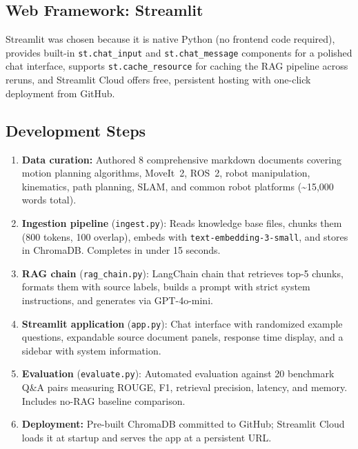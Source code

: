 \documentclass[12pt, a4paper]{article}
\begin{document}
\subsection{Web Framework: Streamlit}

Streamlit was chosen because it is native Python (no frontend code required), provides built-in \texttt{st.chat\_input} and \texttt{st.chat\_message} components for a polished chat interface, supports \texttt{st.cache\_resource} for caching the RAG pipeline across reruns, and Streamlit Cloud offers free, persistent hosting with one-click deployment from GitHub.

\subsection{Development Steps}

\begin{enumerate}
    \item \textbf{Data curation:} Authored 8 comprehensive markdown documents covering motion planning algorithms, MoveIt~2, ROS~2, robot manipulation, kinematics, path planning, SLAM, and common robot platforms (\textasciitilde15,000 words total).

    \item \textbf{Ingestion pipeline} (\texttt{ingest.py}): Reads knowledge base files, chunks them (800 tokens, 100 overlap), embeds with \texttt{text-embedding-3-small}, and stores in ChromaDB. Completes in under 15 seconds.

    \item \textbf{RAG chain} (\texttt{rag\_chain.py}): LangChain chain that retrieves top-5 chunks, formats them with source labels, builds a prompt with strict system instructions, and generates via GPT-4o-mini.

    \item \textbf{Streamlit application} (\texttt{app.py}): Chat interface with randomized example questions, expandable source document panels, response time display, and a sidebar with system information.

    \item \textbf{Evaluation} (\texttt{evaluate.py}): Automated evaluation against 20 benchmark Q\&A pairs measuring ROUGE, F1, retrieval precision, latency, and memory. Includes no-RAG baseline comparison.

    \item \textbf{Deployment:} Pre-built ChromaDB committed to GitHub; Streamlit Cloud loads it at startup and serves the app at a persistent URL.
\end{enumerate}
\end{document}
